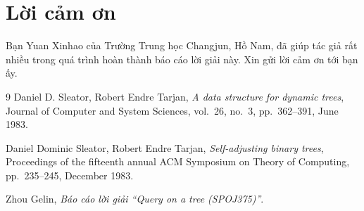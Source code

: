 \documentclass[11pt]{article}
\begin{document}
\appendix
\section{Lời cảm ơn}

Bạn Yuan Xinhao của Trường Trung học Changjun, Hồ Nam, đã giúp tác giả rất
nhiều trong quá trình hoàn thành báo cáo lời giải này. Xin gửi lời cảm ơn tới
bạn ấy.

\begin{thebibliography}{9}
Daniel D. Sleator, Robert Endre Tarjan,
\textit{A data structure for dynamic trees},
Journal of Computer and System Sciences, vol.~26, no.~3, pp.~362--391,
June 1983.

Daniel Dominic Sleator, Robert Endre Tarjan,
\textit{Self-adjusting binary trees},
Proceedings of the fifteenth annual ACM Symposium on Theory of Computing,
pp.~235--245, December 1983.

Zhou Gelin,
\textit{Báo cáo lời giải ``Query on a tree (SPOJ375)''}.
\end{thebibliography}
\end{document}
